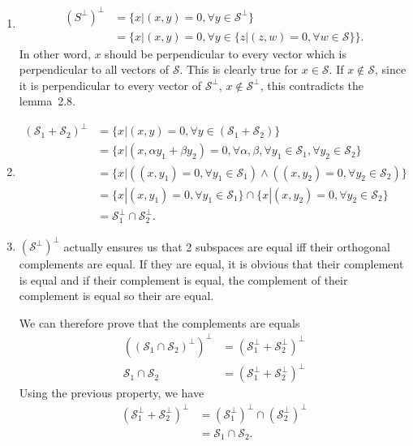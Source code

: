 \begin{solution}
  \begin{enumerate}
    \item
      \begin{align*}
        (S^\perp)^\perp
        & = \{x | (x,y) = 0, \forall y \in \mathcal{S}^\perp\}\\
        & = \{x | (x,y) = 0, \forall y \in \{z | (z,w) = 0, \forall w \in \mathcal{S}\}\}.
      \end{align*}
      In other word, $x$ should be perpendicular to every vector which is perpendicular to all vectors of $\mathcal{S}$.
      This is clearly true for $x \in \mathcal{S}$.
      If $x \notin \mathcal{S}$, since it is perpendicular to every vector of $\mathcal{S}^\perp$, $x \notin \mathcal{S}^\perp$,
      this contradicts the lemma~2.8.
    \item
      \begin{align*}
        (\mathcal{S}_1 + \mathcal{S}_2)^\perp
        & = \{x | (x,y) = 0, \forall y \in (\mathcal{S}_1+\mathcal{S}_2)\}\\
        & = \{x | (x,\alpha y_1 + \beta y_2) = 0, \forall \alpha,\beta, \forall y_1 \in \mathcal{S}_1, \forall y_2 \in \mathcal{S}_2\}\\
        & = \{x | ((x, y_1) = 0, \forall y_1 \in \mathcal{S}_1) \land ((x, y_2) = 0, \forall y_2 \in \mathcal{S}_2)\}\\
        & = \{x | (x, y_1) = 0, \forall y_1 \in \mathcal{S}_1\} \cap \{x | (x, y_2) = 0, \forall y_2 \in \mathcal{S}_2\}\\
        & = \mathcal{S}_1^\perp \cap \mathcal{S}_2^\perp.
      \end{align*}
    \item
      $(\mathcal{S}^\perp)^\perp$ actually ensures us that
      2 subspaces are equal iff their orthogonal complements are equal.
      If they are equal, it is obvious that their complement is equal
      and if their complement is equal, the complement of their complement is equal so their are equal.

      We can therefore prove that the complements are equals
      \begin{align*}
        ((\mathcal{S}_1 \cap \mathcal{S}_2)^\perp)^\perp
        & = (\mathcal{S}_1^\perp + \mathcal{S}_2^\perp)^\perp\\
        \mathcal{S}_1 \cap \mathcal{S}_2
        & = (\mathcal{S}_1^\perp + \mathcal{S}_2^\perp)^\perp
      \end{align*}
      Using the previous property, we have
      \begin{align*}
        (\mathcal{S}_1^\perp + \mathcal{S}_2^\perp)^\perp
        & = (\mathcal{S}_1^\perp)^\perp \cap (\mathcal{S}_2^\perp)^\perp\\
        & = \mathcal{S}_1 \cap \mathcal{S}_2.
      \end{align*}
  \end{enumerate}
\end{solution}

